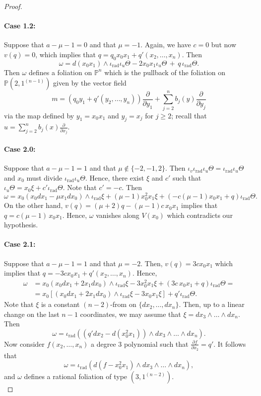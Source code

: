 \documentclass[10pt,a4paper]{amsart}
\def\PP{{\mathbb{P}}}
\newcommand{\del}[1]{\frac{\partial}{\partial #1}}
\newcommand{\pn}{{\mathbb{P}^{n}}}
\DeclareMathOperator{\rad}{rad}
\begin{document}
\begin{proof}
 \paragraph{\textbf{Case 1.2:}} Suppose that $a-\mu-1 = 0$ and that $\mu =-1$. Again, we have $c=0$ but now $v(q) = 0$, which implies that $q = q_0 x_0x_1 + q'(x_2, \dots, x_n)$. Then
 \[
 \omega = d(x_0x_1) \wedge \iota_{\rad}\iota_u \Theta -2x_0x_1\iota_u \Theta \, + \,q \, \iota_{\rad}\Theta.
 \]
 Then $\omega$ defines a foliation on $\pn$ which is the pullback of the foliation on $\PP(2,1^{(n-1)})$ given by the vector field
 \[
 m = (q_0 y_1 + q'(y_2, \dots, y_n))\del{ y_1} + \sum_{j=2}^n b_j(y)\del{ y_j}
 \]
 via the map defined by $y_1 = x_0x_1$ and $y_j = x_j$ for $j\geq 2$; recall that $u = \sum_{j=2}^n b_j(x)\del{ x_j}$.
 \\
 \paragraph{\textbf{Case 2.0:}} Suppose that $a-\mu-1 = 1$ and that $\mu \not\in \{ -2,-1,2\}$. Then $\iota_v\iota_{\rad}\iota_u \Theta = \iota_{\rad}\iota_u \Theta$ and $x_0$ must divide $\iota_{\rad}\iota_u \Theta$. Hence, there exist $\xi$ and $c'$ such that $\iota_u \Theta = x_0 \xi + c'\iota_{\rad}\Theta$. Note that $c' = -c$. Then
 \[
 \omega = x_0(x_0 dx_1 - \mu x_1 dx_0) \wedge \iota_{\rad}\xi + (\mu-1)x_0^2x_1 \xi + (-c(\mu-1)x_0x_1 + q ) \iota_{\rad}\Theta.
 \]
 On the other hand, $v(q) = (\mu+2)q -(\mu-1) c\, x_0x_1$ implies that $q = c(\mu-1)\, x_0x_1$. Hence, $\omega$ vanishes along $V(x_0)$ which contradicts our hypothesis. 
\\
 \paragraph{\textbf{Case 2.1:}} Suppose that $a-\mu-1 = 1$ and that $\mu = -2$. Then, $v(q) = 3 c x_0x_1$ which implies that $q = -3cx_0x_1 + q'(x_2, \dots, x_n)$. Hence,
 \begin{align*}
 \omega &= x_0(x_0 dx_1 +2 x_1 dx_0) \wedge \iota_{\rad}\xi -3x_0^2x_1 \xi + (3c\,x_0x_1 + q ) \iota_{\rad}\Theta = \\
 & = x_0 [(x_0 dx_1 +2 x_1 dx_0) \wedge \iota_{\rad}\xi -3x_0x_1\xi] + q' \iota_{\rad} \Theta. 
 \end{align*}
 Note that $\xi$ is a constant $(n-2)$-from on $\{dx_2, \dots, dx_n\}$. Then, up to a linear change on the last $n-1$ coordinates, we may assume that $\xi = dx_3\wedge \dots \wedge dx_n$. Then
 \[
 \omega = \iota_{\rad}( (q'dx_2- d(x_0^2x_1))\wedge dx_3 \wedge \dots \wedge dx_n).
 \]
 Now consider $f(x_2, \dots, x_n)$ a degree $3$ polynomial such that $\frac{\partial f}{\partial x_2} = q'$. It follows that 
 \[
 \omega = \iota_{\rad}( d(f-x_0^2x_1)\wedge dx_3 \wedge \dots \wedge dx_n),
 \]
 and $\omega$ defines a rational foliation of type $(3,1^{(n-2)})$. 
 \\

\end{proof}
\end{document}
